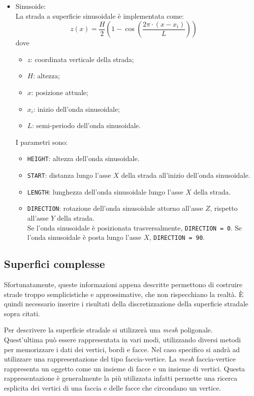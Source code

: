 \begin{itemize}
\begin{pseudoc}
	{ X_road	Z_left	Z_right }
	(XZ_DATA)
	-1.0e04	0	0
	0.0500	0	0
	0.1000	0	0
	0.1500	0	0
	... ... ...
	\end{pseudoc}
	\item Sinusoide:\\
	La strada a superficie sinusoidale è implementata come:
	\begin{equation}
	z(x)=\frac{H}{2}\left( 1 - \cos \left( \frac{2\pi \cdot (x-x_i)}{L} \right)   \right) 
	\end{equation}
	dove	
	\begin{itemize}
	 	\item $z$: coordinata verticale della strada;
	 	\item $H$: altezza;
	 	\item $x$: posizione attuale;
	 	\item $x_i$: inizio dell'onda sinusoidale;
	 	\item $L$: semi-periodo dell'onda sinusoidale.
	\end{itemize}
	I parametri sono:	
	\begin{itemize}
		\item \texttt{HEIGHT}: altezza dell'onda sinusoidale.
		\item \texttt{START}: distanza lungo l'asse $X$ della strada all'inizio dell'onda sinusoidale.
		\item \texttt{LENGTH}: lunghezza dell'onda sinusoidale lungo l'asse $X$ della strada.
		\item \texttt{DIRECTION}: rotazione dell'onda sinusoidale attorno all'asse $Z$, rispetto all'asse $Y$ della strada.\\
		Se l'onda sinusoidale è posizionata trasversalmente, \texttt{DIRECTION = 0}. Se l'onda sinusoidale è posta lungo l'asse $X$, \texttt{DIRECTION = 90}.
	\end{itemize}
\end{itemize}
%
%
\subsection{Superfici complesse}
Sfortunatamente, queste informazioni appena descritte permettono di costruire strade troppo semplicistiche e approssimative, che non rispecchiano la realtà. È quindi necessario inserire i risultati della discretizzazione della superficie stradale sopra citati.

Per descrivere la superficie stradale si utilizzerà una \textit{mesh} poligonale. Quest'ultima può essere rappresentata in vari modi, utilizzando diversi metodi per memorizzare i dati dei vertici, bordi e facce. Nel caso specifico si andrà ad utilizzare una rappresentazione del tipo faccia-vertice. La \textit{mesh} faccia-vertice rappresenta un oggetto come un insieme di facce e un insieme di vertici. Questa rappresentazione è generalmente la più utilizzata infatti permette una ricerca esplicita dei vertici di una faccia e delle facce che circondano un vertice.

